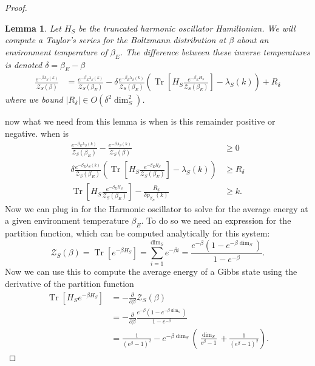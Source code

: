 \documentclass{article}
\newtheorem{lemma}[theorem]{Lemma}
\newcommand{\parens}[1]{\left( #1 \right)}
\newcommand{\brackets}[1]{\left[ #1 \right]}
\newcommand{\bigo}[1]{O\left( #1 \right)}
\DeclareMathOperator{\Tr}{Tr}
\newcommand{\trace}[1]{\Tr \brackets{ #1 }}
\newcommand{\partfun}{\mathcal{Z}}
\begin{document}
\begin{proof}
 
    \begin{lemma}
        Let $H_S$ be the truncated harmonic oscillator Hamiltonian. We will compute a Taylor's series for the Boltzmann distribution at $\beta$ about an environment temperature of $\beta_E$. The difference between these inverse temperatures is denoted $\delta = \beta_E - \beta$
        \begin{align}
            \frac{e^{-\beta \lambda_S(k)}}{\partfun_S(\beta)} &= \frac{e^{-\beta_E \lambda_S(k)}}{\partfun_S(\beta_E)} - \delta \frac{e^{-\beta_E \lambda_S(k)}}{\partfun_S(\beta_E)} \parens{\trace{H_S \frac{e^{-\beta_E H_S}}{\partfun_S(\beta_E)}} - \lambda_S(k)} + R_{\delta}
        \end{align}
        where we bound $|R_{\delta}| \in \bigo{\delta^2 \dim_S^2}$.
    \end{lemma}
    now what we need from this lemma is when is this remainder positive or negative. when is
    \begin{align}
        \frac{e^{-\beta_E \lambda_S(k)}}{\partfun_S(\beta_E)} - \frac{e^{-\beta \lambda_S(k)}}{\partfun_S(\beta)} &\geq 0 \\
        \delta \frac{e^{-\beta_E \lambda_S(k)}}{\partfun_S(\beta_E)} \parens{\trace{H_S \frac{e^{-\beta_E H_S}}{\partfun_S(\beta_E)}} - \lambda_S(k)} &\geq R_{\delta} \\
        \trace{H_S \frac{e^{-\beta_E H_S}}{\partfun_S(\beta_E)}} - \frac{R_{\delta}}{\delta p_{\beta_E}(k)} &\geq k.
    \end{align}
    Now we can plug in for the Harmonic oscillator to solve for the average energy at a given environment temperature $\beta_E$. To do so we need an expression for the partition function, which can be computed analytically for this system:
    \begin{equation}
        \partfun_S(\beta) = \trace{e^{-\beta H_S}} = \sum_{i = 1}^{\dim_S} e^{-\beta i} = \frac{e^{-\beta} (1 - e^{-\beta \dim_S})}{1 - e^{-\beta}}.
    \end{equation}
    Now we can use this to compute the average energy of a Gibbs state using the derivative of the partition function
    \begin{align}
        \trace{H_S e^{-\beta H_S}} &= - \frac{\partial}{\partial \beta} \partfun_S(\beta) \\
        &= - \frac{\partial}{\partial \beta} \frac{e^{-\beta} (1 - e^{-\beta \dim_S})}{1 - e^{-\beta}} \\
        &= \frac{1}{(e^{\beta} - 1)^2} - e^{-\beta \dim_S} \parens{\frac{\dim_S}{e^{\beta} - 1} + \frac{1}{(e^{\beta} - 1)^2}}.

\end{align}
\end{proof}
\end{document}
